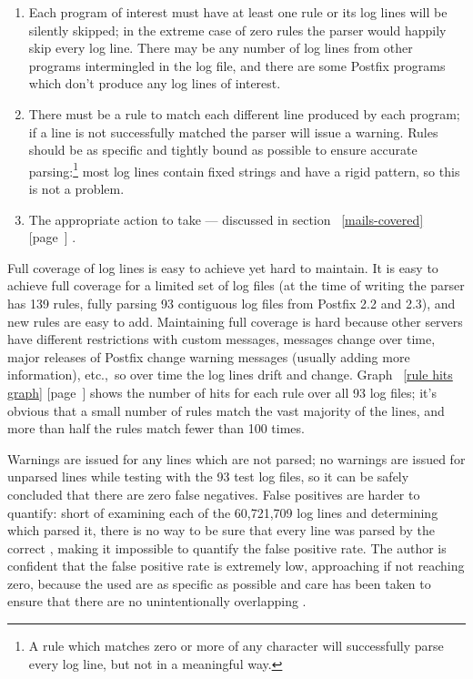 \documentclass[a4paper,12pt,draft]{article}
\newcommand{\refwithpage}[1]{%
    \empty{}\ref{#1} [page~\pageref{#1}]%
}
\begin{document}
\begin{enumerate}

    \item Each program of interest must have at least one rule or its log
        lines will be silently skipped; in the extreme case of zero rules
        the parser would happily skip every log line.  There may be any
        number of log lines from other programs intermingled in the log
        file, and there are some Postfix programs which don't produce any
        log lines of interest.

    \item There must be a rule to match each different line produced by
        each program; if a line is not successfully matched the parser will
        issue a warning.  Rules should be as specific and tightly bound as
        possible to ensure accurate parsing:\footnote{A rule which matches
        zero or more of any character will successfully parse every log
        line, but not in a meaningful way.} most log lines contain fixed
        strings and have a rigid pattern, so this is not a problem.

    \item The appropriate action to take --- discussed in
        section~\refwithpage{mails-covered}.

\end{enumerate}

Full coverage of log lines is easy to achieve yet hard to maintain.  It is
easy to achieve full coverage for a limited set of log files (at the time
of writing the parser has 139 rules, fully parsing 93 contiguous log files
from Postfix 2.2 and 2.3), and new rules are easy to add.  Maintaining full
coverage is hard because other servers have different restrictions with
custom messages, \RBL{} messages change over time, major releases of
Postfix change warning messages (usually adding more information), etc.,\
so over time the log lines drift and change.  Graph~\refwithpage{rule hits
graph} shows the number of hits for each rule over all 93 log files; it's
obvious that a small number of rules match the vast majority of the lines,
and more than half the rules match fewer than 100 times.

Warnings are issued for any lines which are not parsed; no warnings are
issued for unparsed lines while testing with the 93 test log files, so it
can be safely concluded that there are zero false negatives.  False
positives are harder to quantify: short of examining each of the 60,721,709
log lines and determining which \regex{} parsed it, there is no way to be
sure that every line was parsed by the correct \regex{}, making it
impossible to quantify the false positive rate.  The author is confident
that the false positive rate is extremely low, approaching if not reaching
zero, because the \regexes{} used are as specific as possible and care has
been taken to ensure that there are no unintentionally overlapping
\regexes{}.
\end{document}
